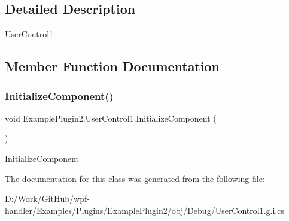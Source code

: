 \subsection{Detailed Description}
\mbox{\hyperlink{class_example_plugin2_1_1_user_control1}{User\+Control1}} 



\subsection{Member Function Documentation}
\mbox{\label{class_example_plugin2_1_1_user_control1_ae9a366b4fef6063fc10c44cb83b654cd}} 
\subsubsection{\texorpdfstring{Initialize\+Component()}{InitializeComponent()}}
{\footnotesize\ttfamily void Example\+Plugin2.\+User\+Control1.\+Initialize\+Component (\begin{DoxyParamCaption}{ }\end{DoxyParamCaption})}



Initialize\+Component 



The documentation for this class was generated from the following file\+:\begin{DoxyCompactItemize}
\item 
D\+:/\+Work/\+Git\+Hub/wpf-\/handler/\+Examples/\+Plugins/\+Example\+Plugin2/obj/\+Debug/User\+Control1.\+g.\+i.\+cs\end{DoxyCompactItemize}
